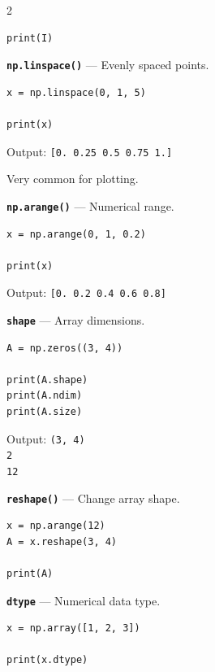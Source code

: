 \documentclass[10pt,a4paper]{article}
\begin{document}
\begin{multicols}{2}
\begin{card}
\begin{lstlisting}[style=pythonstyle]
print(I)
\end{lstlisting}
\end{card}

\begin{card}
\textbf{\texttt{np.linspace()}} --- Evenly spaced points.

\begin{lstlisting}[style=pythonstyle]
x = np.linspace(0, 1, 5)

print(x)
\end{lstlisting}

Output:
\texttt{[0. 0.25 0.5 0.75 1.]}

Very common for plotting.
\end{card}

\begin{card}
\textbf{\texttt{np.arange()}} --- Numerical range.

\begin{lstlisting}[style=pythonstyle]
x = np.arange(0, 1, 0.2)

print(x)
\end{lstlisting}

Output:
\texttt{[0. 0.2 0.4 0.6 0.8]}
\end{card}

\begin{card}
\textbf{\texttt{shape}} --- Array dimensions.

\begin{lstlisting}[style=pythonstyle]
A = np.zeros((3, 4))

print(A.shape)
print(A.ndim)
print(A.size)
\end{lstlisting}

Output:
\texttt{(3, 4)}\\
\texttt{2}\\
\texttt{12}
\end{card}

\begin{card}
\textbf{\texttt{reshape()}} --- Change array shape.

\begin{lstlisting}[style=pythonstyle]
x = np.arange(12)
A = x.reshape(3, 4)

print(A)
\end{lstlisting}
\end{card}

\begin{card}
\textbf{\texttt{dtype}} --- Numerical data type.

\begin{lstlisting}[style=pythonstyle]
x = np.array([1, 2, 3])

print(x.dtype)
\end{lstlisting}
\end{card}


\end{multicols}
\end{document}
